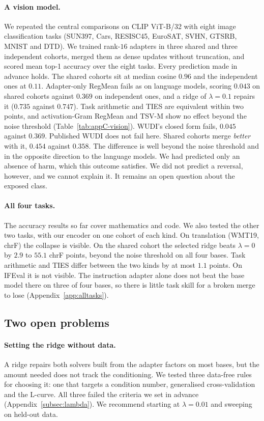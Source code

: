\paragraph{A vision model.} We repeated the central comparisons on CLIP
ViT-B/32 with eight image classification tasks (SUN397, Cars, RESISC45,
EuroSAT, SVHN, GTSRB, MNIST and DTD). We trained rank-$16$ adapters in three
shared and three independent cohorts, merged them as dense updates without
truncation, and scored mean top-1 accuracy over the eight tasks. Every
prediction made in advance holds. The shared cohorts sit at median cosine $0.96$
and the independent ones at $0.11$. Adapter-only RegMean fails
as on language models, scoring $0.043$ on shared cohorts against $0.369$ on
independent ones, and a ridge of $\lambda = 0.1$ repairs it ($0.735$ against
$0.747$). Task arithmetic and TIES are equivalent within two points, and
activation-Gram RegMean and TSV-M show no effect beyond the noise threshold
(Table~\ref{tab:appC-vision}). WUDI's closed form fails, $0.045$ against
$0.369$. Published WUDI does not fail here.
Shared cohorts merge \emph{better} with it, $0.454$ against $0.358$. The
difference is well beyond the noise threshold and in the opposite direction to
the language models. We had predicted only an absence of harm, which this
outcome satisfies. We did not predict a reversal, however, and we cannot explain
it. It remains an open question about the exposed class.

\paragraph{All four tasks.} The accuracy results so far cover mathematics
and code. We also tested the other two tasks, with our encoder on one
cohort of each kind. On translation (WMT19, chrF) the collapse is visible. On
the shared cohort the selected ridge beats $\lambda = 0$ by $2.9$ to $55.1$
chrF points, beyond the noise threshold on all four bases. Task arithmetic and
TIES differ between the two kinds by at most $1.1$ points. On IFEval it is not visible. The
instruction adapter alone does not beat the base model there on three of
four bases, so there is little task skill for a broken merge to lose
(Appendix~\ref{app:alltasks}).

\subsection{Two open problems}\label{subsec:open}

\paragraph{Setting the ridge without data.} A ridge repairs both solvers
built from the adapter factors on most bases, but the amount needed does not
track the conditioning. We tested three data-free rules for choosing it:
one that targets a condition number, generalised cross-validation and the
L-curve. All three failed the criteria we set in advance
(Appendix~\ref{subsec:lambda}). We recommend starting at $\lambda = 0.01$
and sweeping on held-out data.

